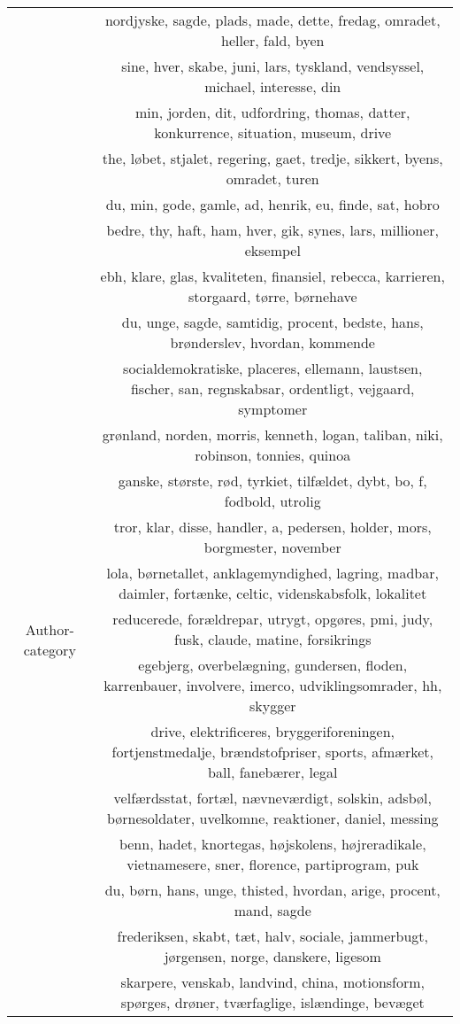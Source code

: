 \begin{table}
\begin{tabular}{c|c}
		& nordjyske, sagde, plads, made, dette, fredag, omradet, heller, fald, byen \\
		& sine, hver, skabe, juni, lars, tyskland, vendsyssel, michael, interesse, din \\
		& min, jorden, dit, udfordring, thomas, datter, konkurrence, situation, museum, drive \\
		& the, løbet, stjalet, regering, gaet, tredje, sikkert, byens, omradet, turen \\
		& du, min, gode, gamle, ad, henrik, eu, finde, sat, hobro \\
		& bedre, thy, haft, ham, hver, gik, synes, lars, millioner, eksempel \\
		\midrule
		\multirow{15}{*}{Author-category} & ebh, klare, glas, kvaliteten, finansiel, rebecca, karrieren, storgaard, tørre, børnehave \\
		& du, unge, sagde, samtidig, procent, bedste, hans, brønderslev, hvordan, kommende \\
		& socialdemokratiske, placeres, ellemann, laustsen, fischer, san, regnskabsar, ordentligt, vejgaard, symptomer \\
		& grønland, norden, morris, kenneth, logan, taliban, niki, robinson, tonnies, quinoa \\
		& ganske, største, rød, tyrkiet, tilfældet, dybt, bo, f, fodbold, utrolig \\
		& tror, klar, disse, handler, a, pedersen, holder, mors, borgmester, november \\
		& lola, børnetallet, anklagemyndighed, lagring, madbar, daimler, fortænke, celtic, videnskabsfolk, lokalitet \\
		& reducerede, forældrepar, utrygt, opgøres, pmi, judy, fusk, claude, matine, forsikrings \\
		& egebjerg, overbelægning, gundersen, floden, karrenbauer, involvere, imerco, udviklingsomrader, hh, skygger \\
		& drive, elektrificeres, bryggeriforeningen, fortjenstmedalje, brændstofpriser, sports, afmærket, ball, fanebærer, legal \\
		& velfærdsstat, fortæl, nævneværdigt, solskin, adsbøl, børnesoldater, uvelkomne, reaktioner, daniel, messing \\
		& benn, hadet, knortegas, højskolens, højreradikale, vietnamesere, sner, florence, partiprogram, puk \\
		& du, børn, hans, unge, thisted, hvordan, arige, procent, mand, sagde \\
		& frederiksen, skabt, tæt, halv, sociale, jammerbugt, jørgensen, norge, danskere, ligesom \\
		& skarpere, venskab, landvind, china, motionsform, spørges, drøner, tværfaglige, islændinge, bevæget \\
	\end{tabular}
\end{table}
